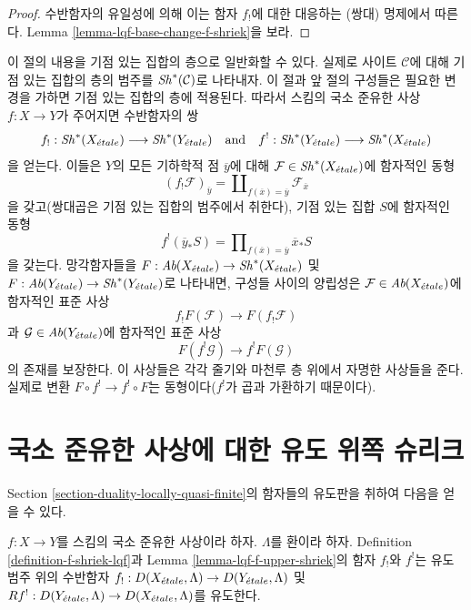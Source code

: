 \begin{proof}
수반함자의 유일성에 의해 이는 함자 $f_!$에 대한 대응하는 (쌍대)
명제에서 따른다. Lemma
\ref{lemma-lqf-base-change-f-shriek}을 보라.
\end{proof}

\begin{remark}
\label{remark-pointed-sets}
이 절의 내용을 기점 있는 집합의 층으로 일반화할 수 있다. 실제로
사이트 $\mathcal{C}$에 대해 기점 있는 집합의 층의 범주를
$\mathop{\mathit{Sh}}\nolimits^*(\mathcal{C})$로 나타내자. 이 절과 앞 절의 구성들은 필요한
변경을 가하면 기점 있는 집합의 층에 적용된다. 따라서 스킴의 국소
준유한 사상 $f : X \to Y$가 주어지면 수반함자의 쌍
$$
f_! : \mathop{\mathit{Sh}}\nolimits^*(X_{\acute{e}tale}) \longrightarrow \mathop{\mathit{Sh}}\nolimits^*(Y_{\acute{e}tale})
\quad\text{and}\quad
f^! : \mathop{\mathit{Sh}}\nolimits^*(Y_{\acute{e}tale}) \longrightarrow \mathop{\mathit{Sh}}\nolimits^*(X_{\acute{e}tale})
$$
을 얻는다. 이들은 $Y$의 모든 기하학적 점 $\overline{y}$에 대해
$\mathcal{F} \in \mathop{\mathit{Sh}}\nolimits^*(X_{\acute{e}tale})$에 함자적인 동형
$$
(f_!\mathcal{F})_{\overline{y}} =
\coprod\nolimits_{f(\overline{x}) = \overline{y}}
\mathcal{F}_{\overline{x}}
$$
을 갖고(쌍대곱은 기점 있는 집합의 범주에서 취한다), 기점 있는 집합
$S$에 함자적인 동형
$$
f^!(\overline{y}_*S) =
\prod\nolimits_{f(\overline{x}) = \overline{y}}
\overline{x}_*S
$$
을 갖는다. 망각함자들을
$F : \textit{Ab}(X_{\acute{e}tale}) \to \mathop{\mathit{Sh}}\nolimits^*(X_{\acute{e}tale})$ 및
$F : \textit{Ab}(Y_{\acute{e}tale}) \to \mathop{\mathit{Sh}}\nolimits^*(Y_{\acute{e}tale})$로 나타내면, 구성들
사이의 양립성은 $\mathcal{F} \in \textit{Ab}(X_{\acute{e}tale})$에 함자적인
표준 사상
$$
f_!F(\mathcal{F}) \longrightarrow F(f_!\mathcal{F})
$$
과 $\mathcal{G} \in \textit{Ab}(Y_{\acute{e}tale})$에 함자적인 표준 사상
$$
F(f^!\mathcal{G}) \longrightarrow f^!F(\mathcal{G})
$$
의 존재를 보장한다. 이 사상들은 각각 줄기와 마천루 층 위에서 자명한
사상들을 준다. 실제로 변환 $F \circ f^! \to f^! \circ F$는
동형이다($f^!$가 곱과 가환하기 때문이다).
\end{remark}







\section{국소 준유한 사상에 대한 유도 위쪽 슈리크}
\label{section-derived-duality-locally-quasi-finite}

\noindent
Section \ref{section-duality-locally-quasi-finite}의 함자들의 유도판을
취하여 다음을 얻을 수 있다.

\begin{lemma}
\label{lemma-lqf-shriek-derived}
$f : X \to Y$를 스킴의 국소 준유한 사상이라 하자.
$\Lambda$를 환이라 하자. Definition \ref{definition-f-shriek-lqf}과
Lemma \ref{lemma-lqf-f-upper-shriek}의 함자 $f_!$와 $f^!$는 유도범주
위의 수반함자
$f_! : D(X_{\acute{e}tale}, \Lambda) \to D(Y_{\acute{e}tale}, \Lambda)$ 및
$Rf^! : D(Y_{\acute{e}tale}, \Lambda) \to D(X_{\acute{e}tale}, \Lambda)$를 유도한다.
\end{lemma}

